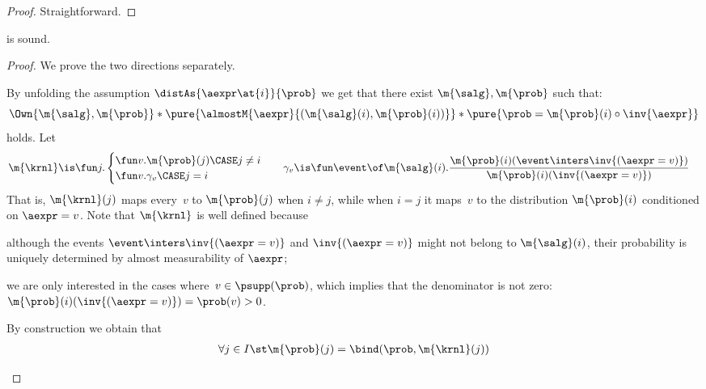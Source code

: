 \begin{proof}
  Straightforward.
\end{proof} \begin{lemma}
\label{proof:c-unit-r}
   is sound.
\end{lemma}

\begin{proof}
  We prove the two directions separately.

  \begin{casesplit}
  \case*[Forward direction $\distAs{\aexpr\at{i}}{\prob} \proves \CC\prob v.\sure{\aexpr\at{i} = v}$]
    By unfolding the assumption $\distAs{\aexpr\at{i}}{\prob}$ we get
    that there exist $\m{\salg},\m{\prob}$ such that:
    \[
      \Own{\m{\salg},\m{\prob}}
      *
      \pure{
        \almostM{\aexpr}{(\m{\salg}(i),\m{\prob}(i))}
      }
      *
      \pure{
        \prob = \m{\prob}(i) \circ \inv{\aexpr}
      }
    \]
    holds.
    Let
    \begin{align*}
      \m{\krnl} &\is
      \fun j.
        \begin{cases}
          \fun v. \m{\prob}(j) \CASE j \ne i
          \\
          \fun v. \gamma_v     \CASE j=i
        \end{cases}
      &
      \gamma_v &\is
        \fun \event \of \m{\salg}(i).
          \frac{\m{\prob}(i)(\event \inters \inv{(\aexpr=v)})}
               {\m{\prob}(i)(\inv{(\aexpr=v)})}
    \end{align*}
    That is, $\m{\krnl}(j)$ maps every~$v$ to $\m{\prob}(j)$ when $i\ne j$,
    while when $i=j$ it maps~$v$ to the distribution $\m{\prob}(i)$ conditioned on $\aexpr=v$.
    Note that $\m{\krnl}$ is well defined because
    \begin{enumerate*}
      \item
        although the events
        $\event \inters \inv{(\aexpr=v)}$ and
        $\inv{(\aexpr=v)}$
        might not belong to $\m{\salg}(i)$,
        their probability is uniquely determined
        by almost measurability of $\aexpr$;
      \item
        we are only interested in the cases where~$v \in \psupp(\prob)$,
        which implies that the denominator is not zero:
        $\m{\prob}(i)(\inv{(\aexpr=v)}) = \prob(v) > 0$.
    \end{enumerate*}
    By construction we obtain that
    \begin{gather}
      \forall j \in I\st
        \m{\prob}(j) = \bind(\prob, \m{\krnl}(j))

\end{gather}
\end{casesplit}
\end{proof}

